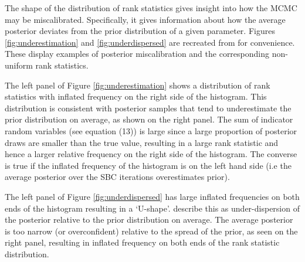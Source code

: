 \documentclass[12pt, a4paper]{article}
\begin{document}
            The shape of the distribution of rank statistics gives insight into how the MCMC may be miscalibrated. Specifically, it gives information about how the average posterior deviates from the prior distribution of a given parameter. Figures \ref{fig:underestimation} and \ref{fig:underdispersed} are recreated from \citet{talts2020validating} for convenience. These display examples of posterior miscalibration and the corresponding non-uniform rank statistics.

            The left panel of Figure \ref{fig:underestimation} shows a distribution of rank statistics with inflated frequency on the right side of the histogram. This distribution is consistent with posterior samples that tend to underestimate the prior distribution on average, as shown on the right panel. The sum of indicator random variables (see equation (13)) is large since a large proportion of posterior draws are smaller than the true value, resulting in a large rank statistic and hence a larger relative frequency on the right side of the histogram. The converse is true if the inflated frequency of the histogram is on the left hand side (i.e the average posterior over the SBC iterations overestimates prior). 

            The left panel of Figure \ref{fig:underdispersed} has large inflated frequencies on both ends of the histogram resulting in a `U-shape'. \citet{talts2020validating} describe this as under-dispersion of the posterior relative to the prior distribution on average. The average posterior is too narrow (or overconfident) relative to the spread of the prior, as seen on the right panel, resulting in inflated frequency on both ends of the rank statistic distribution. 

        
\end{document}
